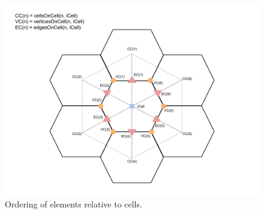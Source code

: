 \documentclass[11pt]{report}
\begin{document}
\begin{figure}
	\centering
	\includegraphics[scale=0.4]{figures/Cell Diagram.pdf}
	\caption{Ordering of elements relative to cells.}
\end{figure}
\end{document}
